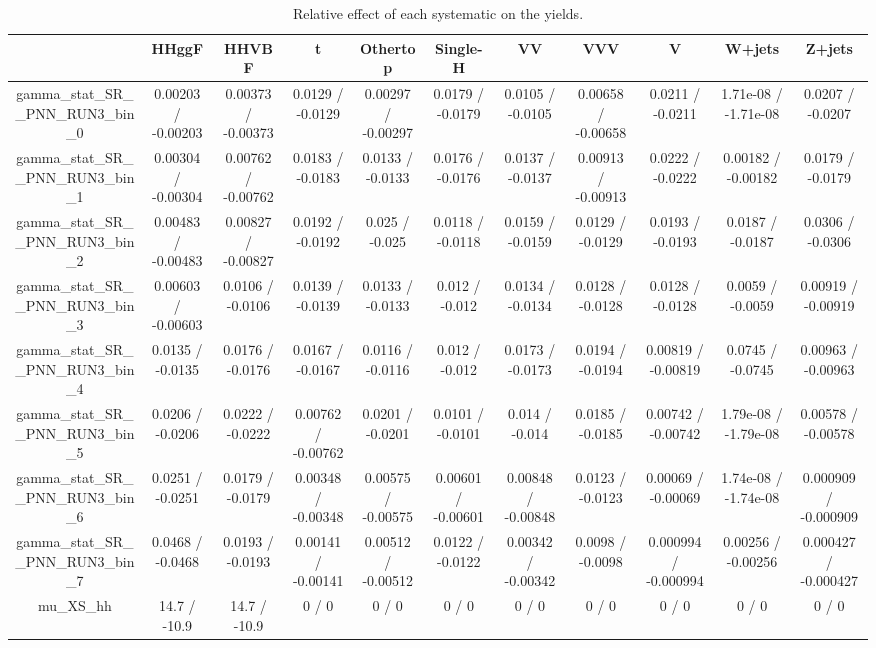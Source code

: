 \documentclass[10pt]{article}
\begin{document}
\begin{table}[htbp]
\begin{center}
\begin{tabular}{|c|c|c|c|c|c|c|c|c|c|c|}
\hline 
      & HHggF      & HHVBF      & t      & Othertop      & Single-H      & VV      & VVV      & V      & W+jets      & Z+jets \\ 
\hline 
  gamma_stat_SR__PNN_RUN3_bin_0 & 0.00203 / -0.00203 & 0.00373 / -0.00373 & 0.0129 / -0.0129 & 0.00297 / -0.00297 & 0.0179 / -0.0179 & 0.0105 / -0.0105 & 0.00658 / -0.00658 & 0.0211 / -0.0211 & 1.71e-08 / -1.71e-08 & 0.0207 / -0.0207 \\ 
  gamma_stat_SR__PNN_RUN3_bin_1 & 0.00304 / -0.00304 & 0.00762 / -0.00762 & 0.0183 / -0.0183 & 0.0133 / -0.0133 & 0.0176 / -0.0176 & 0.0137 / -0.0137 & 0.00913 / -0.00913 & 0.0222 / -0.0222 & 0.00182 / -0.00182 & 0.0179 / -0.0179 \\ 
  gamma_stat_SR__PNN_RUN3_bin_2 & 0.00483 / -0.00483 & 0.00827 / -0.00827 & 0.0192 / -0.0192 & 0.025 / -0.025 & 0.0118 / -0.0118 & 0.0159 / -0.0159 & 0.0129 / -0.0129 & 0.0193 / -0.0193 & 0.0187 / -0.0187 & 0.0306 / -0.0306 \\ 
  gamma_stat_SR__PNN_RUN3_bin_3 & 0.00603 / -0.00603 & 0.0106 / -0.0106 & 0.0139 / -0.0139 & 0.0133 / -0.0133 & 0.012 / -0.012 & 0.0134 / -0.0134 & 0.0128 / -0.0128 & 0.0128 / -0.0128 & 0.0059 / -0.0059 & 0.00919 / -0.00919 \\ 
  gamma_stat_SR__PNN_RUN3_bin_4 & 0.0135 / -0.0135 & 0.0176 / -0.0176 & 0.0167 / -0.0167 & 0.0116 / -0.0116 & 0.012 / -0.012 & 0.0173 / -0.0173 & 0.0194 / -0.0194 & 0.00819 / -0.00819 & 0.0745 / -0.0745 & 0.00963 / -0.00963 \\ 
  gamma_stat_SR__PNN_RUN3_bin_5 & 0.0206 / -0.0206 & 0.0222 / -0.0222 & 0.00762 / -0.00762 & 0.0201 / -0.0201 & 0.0101 / -0.0101 & 0.014 / -0.014 & 0.0185 / -0.0185 & 0.00742 / -0.00742 & 1.79e-08 / -1.79e-08 & 0.00578 / -0.00578 \\ 
  gamma_stat_SR__PNN_RUN3_bin_6 & 0.0251 / -0.0251 & 0.0179 / -0.0179 & 0.00348 / -0.00348 & 0.00575 / -0.00575 & 0.00601 / -0.00601 & 0.00848 / -0.00848 & 0.0123 / -0.0123 & 0.00069 / -0.00069 & 1.74e-08 / -1.74e-08 & 0.000909 / -0.000909 \\ 
  gamma_stat_SR__PNN_RUN3_bin_7 & 0.0468 / -0.0468 & 0.0193 / -0.0193 & 0.00141 / -0.00141 & 0.00512 / -0.00512 & 0.0122 / -0.0122 & 0.00342 / -0.00342 & 0.0098 / -0.0098 & 0.000994 / -0.000994 & 0.00256 / -0.00256 & 0.000427 / -0.000427 \\ 
  mu_XS_hh & 14.7 / -10.9 & 14.7 / -10.9 & 0 / 0 & 0 / 0 & 0 / 0 & 0 / 0 & 0 / 0 & 0 / 0 & 0 / 0 & 0 / 0 \\ 
\hline 
\end{tabular} 
\caption{Relative effect of each systematic on the yields.} 
\end{center} 
\end{table} 
\end{document}
